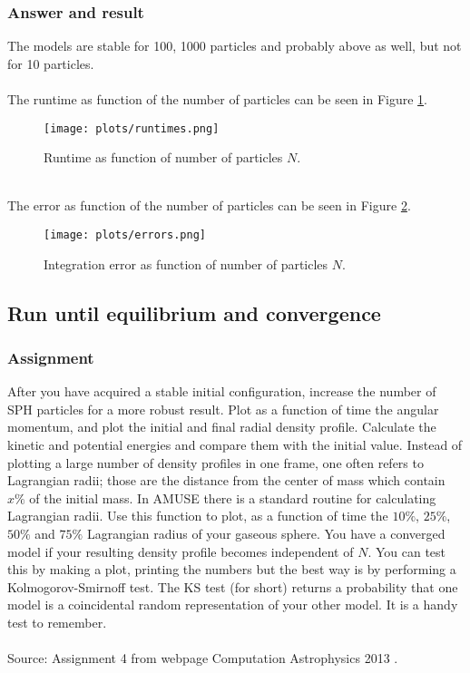\documentclass[a4paper]{article}
\begin{document}
\subsubsection{Answer and result}
The models are stable for 100, 1000 particles and probably above as well, but not for 10 particles.\\
\\
The runtime as function of the number of particles can be seen in Figure \ref{fig:timeplot}.\\
\begin{figure}[h!]
  \begin{center}
    \texttt{[image: plots/runtimes.png]}
    \caption{\label{fig:timeplot}Runtime as function of number of particles $N$.}
  \end{center}
\end{figure}\\
The error as function of the number of particles can be seen in Figure \ref{fig:errorplot}.\\
\begin{figure}[h!]
  \begin{center}
    \texttt{[image: plots/errors.png]}
    \caption{\label{fig:errorplot}Integration error as function of number of particles $N$.}
  \end{center}
\end{figure}
\clearpage
\subsection{Run until equilibrium and convergence}
\label{sec:dist}
\subsubsection{Assignment}
After you have acquired a stable initial configuration, increase the number of SPH particles for a more robust result. Plot as a function of time the angular momentum, and plot the initial and final radial density profile.
Calculate the kinetic and potential energies and compare them with the initial value. Instead of plotting a large number of density profiles in one frame, one often refers to Lagrangian radii; those are the distance from the center of mass which contain $x\%$ of the initial mass. In AMUSE there is a standard routine for calculating Lagrangian radii. Use this function to plot, as a function of time the $10\%$, $25\%$, $50\%$ and $75\%$ Lagrangian radius of your gaseous sphere. You have a converged model if your resulting density profile becomes independent of $N$. You can test this by making a plot, printing the numbers but the best way is by performing a Kolmogorov-Smirnoff test. The KS test (for short) returns a probability that one model is a coincidental random representation of your other model. It is a handy test to remember.\\
\\
Source: Assignment 4 from webpage Computation Astrophysics 2013 \cite{ass4}.
\end{document}
